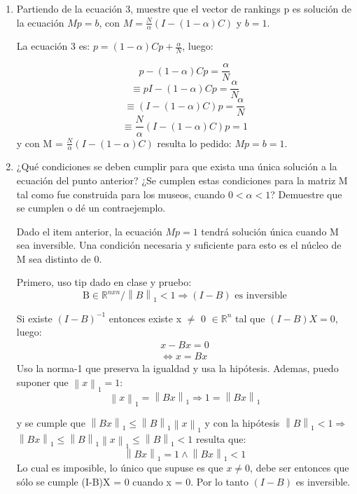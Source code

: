 \documentclass{article}
\newcommand{\norm}[2]{\left \lVert #1 \right \rVert_{#2}}
\begin{document}
\begin{enumerate}
    \item Partiendo de la ecuación 3, muestre que el vector de rankings p es solución de la ecuación
    $Mp = b$,  con $M = \frac{N}{\alpha}  (I - (1 - \alpha )C)$ y $b = 1.$

La ecuación 3 es: $p = (1-\alpha)Cp + \frac{\alpha}{N} $, luego:

\begin{displaymath}
    p - (1-\alpha)Cp = \frac{\alpha}{N}
\end{displaymath}
\begin{displaymath}
    \equiv pI - (1-\alpha)Cp = \frac{\alpha}{N}
\end{displaymath}
\begin{displaymath}
    \equiv (I - (1-\alpha)C)p = \frac{\alpha}{N}
\end{displaymath}
\[ \equiv \frac{N}{\alpha}(I - (1-\alpha)C)p = 1 \]
y con M = $\frac{N}{\alpha}(I - (1-\alpha)C)$ resulta lo pedido: $Mp = b = 1$.

\item ¿Qué condiciones se deben cumplir para que exista una única solución a la ecuación del
punto anterior? ¿Se cumplen estas condiciones para la matriz M tal como fue construida
para los museos, cuando $0 < \alpha < 1$? Demuestre que se cumplen o dé un contraejemplo.

Dado el item anterior, la ecuación $Mp = 1$ tendrá solución única cuando M sea inversible. Una condición necesaria y suficiente para esto es el núcleo de M sea distinto de 0.

Primero, uso tip dado en clase y pruebo: \newline 
\[\text{B} \in \mathbb{R}^{nxn} / \norm{B}{1} < 1 \Rightarrow (I-B) \text{ es inversible}\]

Si existe $(I-B)^{-1}$ entonces existe x $\neq$ 0 $\in \mathbb{R}^{n}$ tal que $(I-B)X = 0$, luego:
\begin{align*} 
x-Bx = 0 \\
\Leftrightarrow x = Bx
\end{align*}
Uso la norma-1 que preserva la igualdad y usa la hipótesis. Ademas, puedo suponer que $\norm{x}{1} = 1$:
\[\norm{x}{1} =  \norm{Bx}{1} \Rightarrow 1 = \norm{Bx}{1}\]

y se cumple que $\norm{Bx}{1} \leq \norm{B}{1}\norm{x}{1}$ y con la hipótesis $\norm{B}{1} < 1 \Rightarrow $
$\norm{Bx}{1} \leq \norm{B}{1}\norm{x}{1} \leq \norm{B}{1} < 1$
resulta que:
\[\norm{Bx}{1} = 1 \wedge \norm{Bx}{1} < 1\]
Lo cual es imposible, lo único que supuse es que $x \neq 0$, debe ser entonces que sólo se cumple (I-B)X = 0 cuando x = 0. Por lo tanto $(I-B)$ es inversible.


\end{enumerate}
\end{document}
